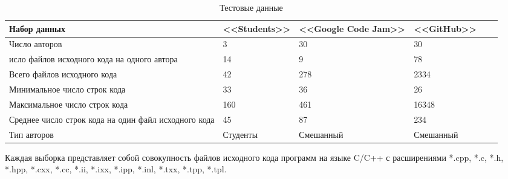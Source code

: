 \begin{table}[h!]
\caption{ Тестовые данные }
\label{tab:data}
\begin{center}
\begin{tabularx}{\linewidth}{|X|X|X|X|X|X|}
\hline
Набор данных & <<Students>> & <<Google Code Jam>> & <<GitHub>> \\
\hline
Число авторов & 3 & 30 & 30 \\
\hline
исло файлов исходного кода на одного автора & 14 & 9 & 78 \\
\hline
Всего файлов исходного кода & 42 & 278 & 2334 \\
\hline
Минимальное число строк кода & 33 & 36 & 26 \\
\hline
Максимальное число строк кода & 160 & 461 & 16348 \\
\hline
Среднее число строк кода на один файл исходного кода & 45 & 87 & 234 \\
\hline
Тип авторов & Студенты & Смешанный & Смешанный \\
\hline
\end{tabularx}
\end{center}
\end{table}


Каждая выборка представляет собой совокупность файлов исходного кода программ на языке C/C++ с расширениями
*.cpp, *.c, *.h, *.hpp, *.cxx, *.cc, *.ii, *.ixx, *.ipp, *.inl, *.txx, *.tpp, *.tpl.



